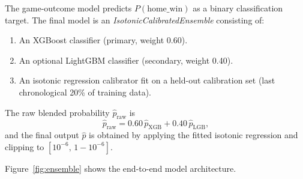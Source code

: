 \documentclass[conference]{IEEEtran}
\begin{document}
The game-outcome model predicts $P(\text{home\_win})$ as a binary
classification target.  The final model is an
\textit{IsotonicCalibratedEnsemble} consisting of:
\begin{enumerate}
  \item An XGBoost classifier (primary, weight 0.60).
  \item An optional LightGBM classifier (secondary, weight 0.40).
  \item An isotonic regression calibrator fit on a held-out
        calibration set (last chronological 20\% of training data).
\end{enumerate}

The raw blended probability $\hat{p}_\text{raw}$ is
\begin{equation}
\hat{p}_\text{raw} = 0.60\,\hat{p}_{\text{XGB}} + 0.40\,\hat{p}_{\text{LGB}},
\label{eq:blend}
\end{equation}
and the final output $\hat{p}$ is obtained by applying the fitted
isotonic regression and clipping to $[10^{-6},\,1-10^{-6}]$.

Figure~\ref{fig:ensemble} shows the end-to-end model architecture.
\end{document}
